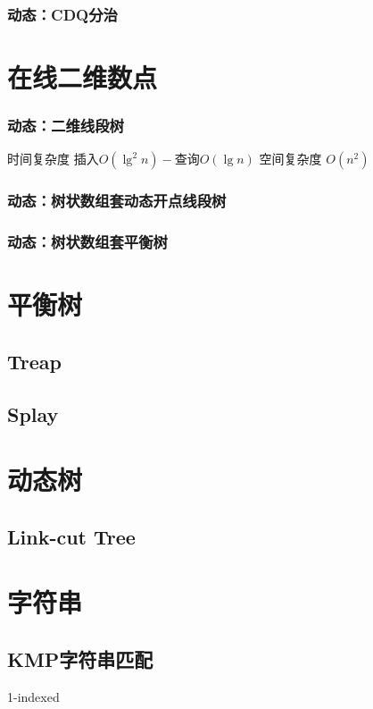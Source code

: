 \documentclass{article}
\begin{document}
			\subsubsection{动态：CDQ分治}
	\section{在线二维数点}
		\subsubsection{动态：二维线段树}
		时间复杂度 $\text{插入} O(\lg^2 n) - \text{查询} O(\lg n)$
		空间复杂度 $O(n^2)$
		\subsubsection{动态：树状数组套动态开点线段树}
		\subsubsection{动态：树状数组套平衡树}
	\newpage

	\section{平衡树}
		\subsection{Treap}
		\subsection{Splay}

	\newpage

	\section{动态树}
		\subsection{Link-cut Tree}

	\newpage

	\section{字符串}
		\subsection{KMP字符串匹配}
		1-indexed
\end{document}
